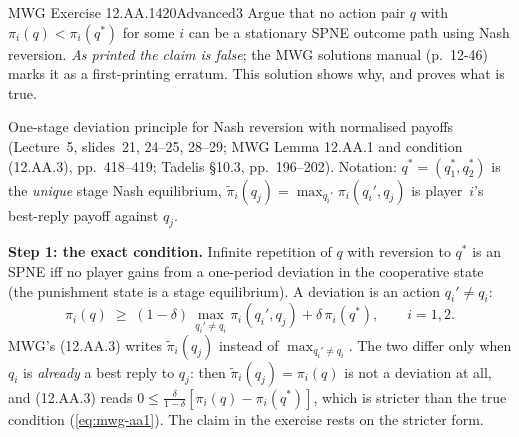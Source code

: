 \begin{exsol}{MWG Exercise 12.AA.1}{420}{Advanced}{3}
\asked Argue that no action pair $q$ with $\pi_i(q) < \pi_i(q^*)$ for some $i$ can be a stationary SPNE
outcome path using Nash reversion. \emph{As printed the claim is false}; the MWG solutions manual (p.~12-46)
marks it as a first-printing erratum. This solution shows why, and proves what is true.

\method One-stage deviation principle for Nash reversion with normalised payoffs (Lecture~5, slides~21,
24--25, 28--29; MWG Lemma 12.AA.1 and condition (12.AA.3), pp.~418--419; Tadelis \S10.3, pp.~196--202). Notation:
$q^* = (q_1^*, q_2^*)$ is the \emph{unique} stage Nash equilibrium, $\tilde\pi_i(q_j) = \max_{q_i'}\pi_i(q_i',q_j)$
is player~$i$'s best-reply payoff against $q_j$.

\solution
\textbf{Step 1: the exact condition.} Infinite repetition of $q$ with reversion to $q^*$ is an SPNE iff
no player gains from a one-period deviation in the cooperative state (the punishment state is a stage
equilibrium). A deviation is an action $q_i' \ne q_i$:
\begin{equation}\label{eq:mwg-aa1}
  \pi_i(q) \;\ge\; (1-\delta)\,\max_{q_i' \ne q_i}\pi_i(q_i',q_j) + \delta\,\pi_i(q^*), \qquad i = 1,2.
\end{equation}
MWG's (12.AA.3) writes $\tilde\pi_i(q_j)$ instead of $\max_{q_i'\ne q_i}$. The two differ only when $q_i$ is
\emph{already} a best reply to $q_j$: then $\tilde\pi_i(q_j) = \pi_i(q)$ is not a deviation at all, and
(12.AA.3) reads $0 \le \frac{\delta}{1-\delta}[\pi_i(q) - \pi_i(q^*)]$, which is stricter than the true condition
(\ref{eq:mwg-aa1}). The claim in the exercise rests on the stricter form.


\end{exsol}
